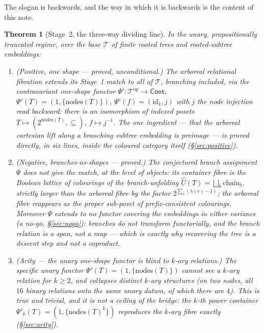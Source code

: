 \documentclass[11pt]{article}
\newtheorem{theorem}{Theorem}
\theoremstyle{definition}
\newcommand{\Cont}{\mathsf{Cont}}
\newcommand{\nodes}{\mathrm{nodes}}
\newcommand{\id}{\mathrm{id}}
\newcommand{\op}{\mathrm{op}}
\newcommand{\Tree}{\mathcal{T}}
\newcommand{\Uf}{\widehat{U}}
\newcommand{\Psip}{\Psi'}
\begin{document}
The slogan is backwards, and the way in which it is backwards is the content of this note.

\begin{theorem}[Stage~2, the three-way dividing line]\label{thm:main}
In the unary, propositionally truncated regime, over the base $\Tree$ of finite rooted trees and
rooted-subtree embeddings:
\begin{enumerate}
\item[\textup{(1)}] \textup{(Positive, one shape --- proved, unconditional.)}
The arboreal relational fibration extends its Stage~1 match to \emph{all} of $\Tree$, branching
included, via the \emph{contravariant} one-shape functor $\Psip\colon\Tree^\op\to\Cont$,
$\Psip(T)=(1,\{\nodes(T)\})$, $\Psip(f)=(\id_1,j)$ with $j$ the node injection read backward: there
is an isomorphism of indexed posets $T\mapsto(2^{\nodes(T)},\subseteq)$, $f\mapsto j^{-1}$. The one
ingredient --- that the arboreal cartesian lift along a branching subtree embedding is preimage ---
is proved directly, in six lines, inside the coloured category itself (\S\ref{sec:positive}).
\item[\textup{(2)}] \textup{(Negative, branches-as-shapes --- proved.)}
The conjectured branch assignment $\Psi$ does \emph{not} give the match, at the level of
\emph{objects}: its container fibre is the Boolean lattice of colourings of the branch-unfolding
$\Uf(T)=\bigsqcup_b \mathrm{chain}_b$, strictly larger than the arboreal fibre by the factor
$2^{\sum_v(\lambda(v)-1)}$; the arboreal fibre reappears as the proper sub-poset of
\emph{prefix-consistent} colourings. Moreover $\Psi$ extends to \emph{no functor} covering the
embeddings in either variance (a no-go, \S\ref{sec:nogo}): branches do not transform functorially,
and the branch relation is a \emph{span}, not a map --- which is exactly why recovering the tree is
a descent step and not a coproduct.
\item[\textup{(3)}] \textup{(Arity --- the unary one-shape functor is blind to $k$-ary relations.)}
The specific unary functor $\Psip(T)=(1,\{\nodes(T)\})$ cannot see a $k$-ary relation for $k\ge2$,
and collapses distinct $k$-ary structures (on two nodes, all $16$ binary relations onto the same
unary datum, of which there are $4$). This is true and \emph{trivial}, and it is \emph{not} a
ceiling of the bridge: the $k$-th power container $\Psip_k(T)=(1,\{\nodes(T)^k\})$ reproduces the
$k$-ary fibre exactly (\S\ref{sec:arity}).
\end{enumerate}
\end{theorem}
\end{document}
